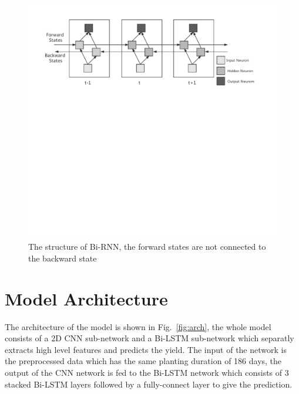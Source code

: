 \documentclass[conference, a4paper]{IEEEtran}
\begin{document}
    \begin{figure}[htbp]
      \centerline{\includegraphics[width=\linewidth]{figures/BRNN.pdf}}
      \caption{The structure of Bi-RNN, the forward states are not connected to the backward state}
      \label{fig:BRNN}
    \end{figure}


    \section{Model Architecture} \label{sec:Arch}
      The architecture of the model is shown in Fig.~\ref{fig:arch}, the whole model consists of a 2D CNN sub-network and a Bi-LSTM sub-network which separatly extracts high level features and predicts the yield. The input of the network is the preprocessed data which has the same planting duration of 186 days, the output of the CNN network is fed to the Bi-LSTM network which consists of 3 stacked Bi-LSTM layers followed by a fully-connect layer to give the prediction.
\end{document}
